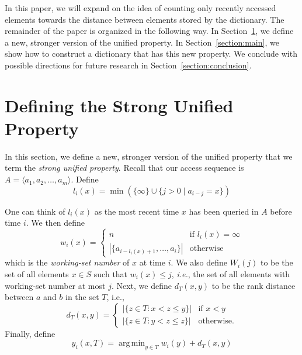 \documentclass{llncs}
\newcommand{\ie}{\textsl{i.e.}}
\DeclareMathOperator*{\argmin}{arg\,min}
\begin{document}
In this paper, we will expand on the idea of counting only recently accessed elements towards the distance between elements stored by the dictionary. The remainder of the paper is organized in the following way. In Section~\ref{section:definitions}, we define a new, stronger version of the unified property. In Section~\ref{section:main}, we show how to construct a dictionary that has this new property. We conclude with possible directions for future research in Section~\ref{section:conclusion}.

\section{Defining the Strong Unified Property}
\label{section:definitions}

In this section, we define a new, stronger version of the unified property that we term the \emph{strong unified property}. Recall that our access sequence is $A = \langle a_1, a_2, \ldots, a_m \rangle$. Define
\begin{displaymath}
	l_i(x) = \min \left( \{ \infty \} \cup \{ j > 0 \;|\; a_{i-j} = x \} \right)
\end{displaymath}

One can think of $l_i(x)$ as the most recent time $x$ has been queried in $A$ before time $i$. We then define
\begin{displaymath}
	w_i(x) =
		\begin{cases}
			n 																	& \text{if } l_i(x) = \infty \\
			|\{ a_{i-l_i(x)+1}, \ldots, a_i \}|	& \text{otherwise}
		\end{cases} 
\end{displaymath}
%
which is the  \emph{working-set number} of $x$ at time $i$. We also define $W_i(j)$ to be the set of all elements $x \in S$ such that $w_i(x) \le j$, \ie, the set of all elements with working-set number at most $j$.  Next, we define $d_T(x,y)$ to be the rank distance between $a$ and $b$ in the set $T$, i.e.,
\[
   d_T(x,y) 
    = \begin{cases}   
      |\{z\in T: x< z \le y\}| & \text{if $x<y$} \\
      |\{z\in T: y< z \le z\}| & \text{otherwise.}
    \end{cases}
\]
Finally, define
\begin{displaymath}
	y_i(x, T) = \argmin_{y \in T} w_i(y) + d_T(x,y)
\end{displaymath}
\end{document}
